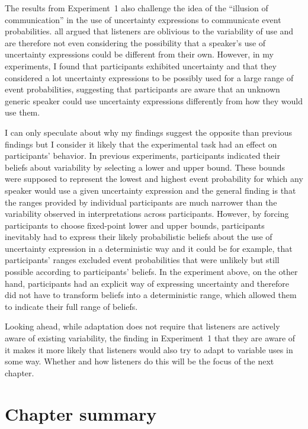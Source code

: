 The results from Experiment~1 also challenge the idea of the ``illusion of communication'' \cite{Budescu2009} in the use of uncertainty expressions
to communicate event probabilities. \cite{AmerHackenbrackNelson1994, BrunTeigen1988, TeigenBrun1999} all argued that listeners are oblivious 
to the variability of use and are therefore not even considering the possibility that a speaker's use of uncertainty expressions could be different from their own.
However, in my experiments, I found that participants exhibited uncertainty and that they considered a lot uncertainty expressions to be possibly used
for a large range of event probabilities, suggesting that participants are aware that an unknown generic speaker could use uncertainty expressions
differently from how they would use them.

I can only speculate about why my findings suggest the opposite than previous findings but I consider it likely that the experimental task
had an effect on participants' behavior. In previous experiments,
participants indicated their beliefs about variability by selecting a lower and upper bound. These bounds were supposed to represent the lowest
and highest event probability for which any speaker would use a given uncertainty expression and the general finding is that the ranges provided
by individual participants are much narrower than the variability observed in interpretations across participants. However, by forcing 
participants to choose fixed-point lower and upper bounds, participants inevitably had to express their likely probabilistic beliefs about the use
of uncertainty expression in a deterministic way and it could be for example, that participants' ranges excluded event probabilities that were 
unlikely but still possible according to participants' beliefs. In the experiment above, on the other hand, participants had an explicit way of
expressing uncertainty and therefore did not have to transform beliefs into a deterministic range, which allowed them to indicate their full range
of beliefs. 

Looking ahead, while adaptation does not require that listeners are actively aware of existing variability, the finding in Experiment~1 that they are
aware of it makes it more likely that listeners would also try to adapt to variable uses in some way. Whether and how listeners do this 
will be the focus of the next chapter.

\section{Chapter summary}


